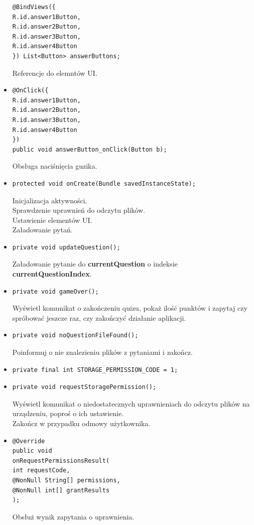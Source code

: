 \documentclass[12pt, a4paper]{article}
\begin{document}
\begin{itemize}
\begin{lstlisting}
@BindViews({
R.id.answer1Button,
R.id.answer2Button,
R.id.answer3Button,
R.id.answer4Button
}) List<Button> answerButtons;
\end{lstlisting}
Referencje do elemntów UI.
\item\begin{lstlisting}
@OnClick({
R.id.answer1Button,
R.id.answer2Button,
R.id.answer3Button,
R.id.answer4Button
})
public void answerButton_onClick(Button b);
\end{lstlisting}
Obsługa naciśnięcia guzika.
\item\begin{lstlisting}
protected void onCreate(Bundle savedInstanceState);
\end{lstlisting}
Inicjalizacja aktywności.\\
Sprawdzenie uprawnień do odczytu plików.\\
Ustawienie elementów UI.\\
Załadowanie pytań.
\item\begin{lstlisting}
private void updateQuestion();
\end{lstlisting}
Załadowanie pytanie do \textbf{currentQuestion} o indeksie \textbf{currentQuestionIndex}.
\item\begin{lstlisting}
private void gameOver();
\end{lstlisting}
Wyświetl komunikat o zakończeniu quizu, pokaż ilość punktów i zapytaj czy spróbować jeszcze raz, czy zakończyć działanie aplikacji.
\item\begin{lstlisting}
private void noQuestionFileFound();
\end{lstlisting}
Poinformuj o nie znalezieniu plików z pytaniami i zakończ.
\item\begin{lstlisting}
private final int STORAGE_PERMISSION_CODE = 1;
\end{lstlisting}
\item\begin{lstlisting}
private void requestStoragePermission();
\end{lstlisting}
Wyświetl komunikat o niedostatecznych uprawnieniach do odczytu plików na urządzeniu, poproś o ich ustawienie.\\
Zakończ w przypadku odmowy użytkownika.
\item\begin{lstlisting}
@Override
public void
onRequestPermissionsResult(
int requestCode,
@NonNull String[] permissions,
@NonNull int[] grantResults
);
\end{lstlisting}
Obsłuż wynik zapytania o uprawnienia.
\end{itemize}
\end{document}
